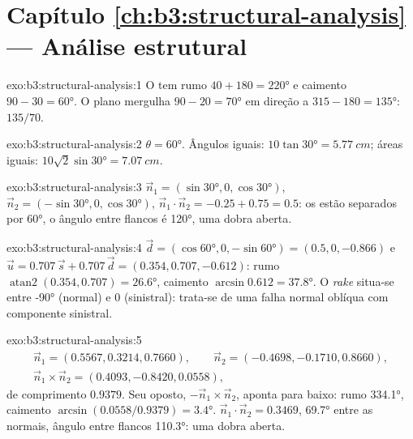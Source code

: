 \section*{Capítulo \ref{ch:b3:structural-analysis} --- Análise estrutural}

\begin{solution}{exo:b3:structural-analysis:1}
O  tem rumo $40 + 180 = \ang{220}$ e caimento $90 - 30 = \ang{60}$. O
plano mergulha $90 - 20 = \ang{70}$ em direção a $315 - 180 = \ang{135}$: $135/70$.
\end{solution}

\begin{solution}{exo:b3:structural-analysis:2}
$\theta = \ang{60}$. Ângulos iguais: $10\tan\ang{30} = \qty{5.77}{cm}$;
áreas iguais: $10\sqrt2\sin\ang{30} = \qty{7.07}{cm}$.
\end{solution}

\begin{solution}{exo:b3:structural-analysis:3}
$\vec n_1 = (\sin\ang{30}, 0, \cos\ang{30})$, $\vec n_2 = (-\sin\ang{30}, 0,
\cos\ang{30})$, $\vec n_1\cdot\vec n_2 = -0.25 + 0.75 = 0.5$: os  estão
separados por \ang{60}, o ângulo entre flancos é \ang{120}, uma dobra aberta.
\end{solution}

\begin{solution}{exo:b3:structural-analysis:4}
$\vec d = (\cos\ang{60}, 0, -\sin\ang{60}) = (0.5, 0, -0.866)$ e $\vec u =
0.707\,\vec s + 0.707\,\vec d = (0.354, 0.707, -0.612)$: rumo
$\operatorname{atan2}(0.354, 0.707) = \ang{26.6}$, caimento $\arcsin0.612 =
\ang{37.8}$. O \textit{rake} situa-se entre \ang{-90} (normal) e 0 (sinistral): trata-se
de uma falha normal oblíqua com componente sinistral.
\end{solution}

\begin{solution}{exo:b3:structural-analysis:5}
\begin{gather*}
  \vec n_1 = (0.5567, 0.3214, 0.7660),\qquad \vec n_2 = (-0.4698, -0.1710, 0.8660),\\
  \vec n_1\times\vec n_2 = (0.4093, -0.8420, 0.0558),
\end{gather*}
de comprimento $0.9379$. Seu oposto, $-\vec n_1\times\vec n_2$, aponta para
baixo: rumo \ang{334.1}, caimento $\arcsin(0.0558/0.9379) = \ang{3.4}$. $\vec n_1\cdot\vec
n_2 = 0.3469$, \ang{69.7} entre as normais, ângulo entre flancos \ang{110.3}:
uma dobra aberta.
\end{solution}

